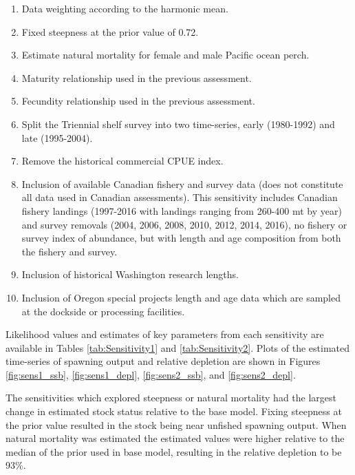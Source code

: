 \documentclass[12pt,]{article}
\begin{document}
\begin{enumerate}

  \item Data weighting according to the harmonic mean.
  
  \item Fixed steepness at the prior value of 0.72.
  
  \item Estimate natural mortality for female and male Pacific ocean perch.
  
  \item Maturity relationship used in the previous assessment.
  
  \item Fecundity relationship used in the previous assessment.
  
  \item Split the Triennial shelf survey into two time-series, early (1980-1992) and late (1995-2004).
  
  \item Remove the historical commercial CPUE index.
  
  \item Inclusion of available Canadian fishery and survey data (does not constitute all data used in Canadian assessments).  This sensitivity includes Canadian fishery landings (1997-2016 with landings ranging from 260-400 mt by year) and survey removals (2004, 2006, 2008, 2010, 2012, 2014, 2016), no fishery or survey index of abundance, but with length and age composition from both the fishery and survey.  
  
  \item Inclusion of historical Washington research lengths.  
  
  \item Inclusion of Oregon special projects length and age data which are sampled at the dockside or processing facilities.  
  
\end{enumerate}

Likelihood values and estimates of key parameters from each sensitivity
are available in Tables \ref{tab:Sensitivity1} and
\ref{tab:Sensitivity2}. Plots of the estimated time-series of spawning
output and relative depletion are shown in Figures \ref{fig:sens1_ssb},
\ref{fig:sens1_depl}, \ref{fig:sens2_ssb}, and \ref{fig:sens2_depl}.

The sensitivities which explored steepness or natural mortality had the
largest change in estimated stock status relative to the base model.
Fixing steepness at the prior value resulted in the stock being near
unfished spawning output. When natural mortality was estimated the
estimated values were higher relative to the median of the prior used in
base model, resulting in the relative depletion to be 93\%.
\end{document}
